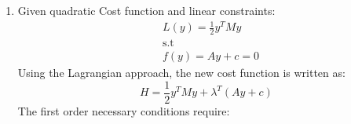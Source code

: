 \begin{enumerate}
\begin{enumerate}
  \item Given quadratic Cost function and linear constraints:
    \begin{align*}
     &L(y) = \frac{1}{2} y^T M y \\
     &\text{s.t}\\
     &f(y) = Ay + c = 0 
    \end{align*}
Using the Lagrangian approach, the new cost function is written as:
    \begin{equation*}
     H = \frac{1}{2} y^T M y + \lambda^T (Ay+c)
    \end{equation*}
   The first order necessary conditions require:

\end{enumerate}
\end{enumerate}
